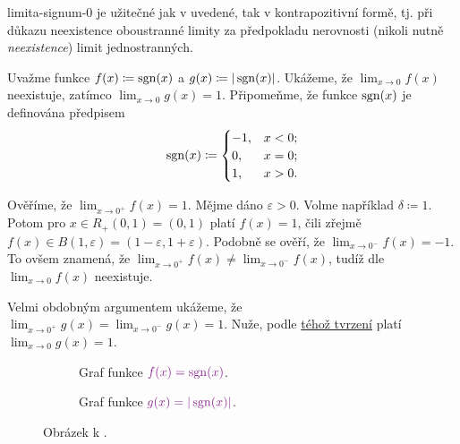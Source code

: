 \begin{example}{}{limita-signum-0}
  je užitečné
 jak v uvedené, tak v kontrapozitivní formě, tj. při důkazu neexistence
 oboustranné limity za předpokladu nerovnosti (nikoli nutně \emph{neexistence})
 limit jednostranných.

 Uvažme funkce $f(x) \coloneqq \operatorname{sgn}(x)$ a $g(x) \coloneqq |\operatorname{sgn}(x)|$. Ukážeme,
 že $\lim_{x \to 0} f(x)$ neexistuje, zatímco $\lim_{x \to 0} g(x) = 1$.
 Připomeňme, že funkce $\operatorname{sgn}(x)$ je definována předpisem
 \[
  \operatorname{sgn}(x) \coloneqq \begin{cases}
   -1, & x < 0;\\
   0, & x = 0;\\
   1, & x > 0.
  \end{cases}
 \]

 Ověříme, že $\lim_{x \to 0^{+}} f(x) = 1$. Mějme dáno $\varepsilon>0$. Volme
 například $\delta \coloneqq 1$. Potom pro $x \in R_+(0,1) = (0,1)$ platí $f(x)
 = 1$, čili zřejmě $f(x) \in B(1,\varepsilon) = (1-\varepsilon,1+\varepsilon)$.
 Podobně se ověří, že $\lim_{x \to 0^{-}} f(x) = -1$. To ovšem znamená, že
 $\lim_{x \to 0^{+}} f(x) \neq \lim_{x \to 0^{-}} f(x)$, tudíž dle
  $\lim_{x \to
 0} f(x)$ neexistuje.

 Velmi obdobným argumentem ukážeme, že $\lim_{x \to 0^{+}} g(x) = \lim_{x \to
 0^{-}} g(x) = 1$. Nuže, podle
 \hyperref[prop:vztah-jednostrannych-a-oboustrannych-limit]{téhož tvrzení} platí
 $\lim_{x \to 0} g(x) = 1$.
\end{example}

\begin{figure}[ht]
 \centering
 \begin{subfigure}[b]{0.49\textwidth}
  \centering
  \caption{Graf funkce $\clm{f(x) = \sign(x)}$.}
 \end{subfigure}
 \begin{subfigure}[b]{0.49\textwidth}
  \centering
  \caption{Graf funkce $\clm{g(x) = |\sign(x)|}$.}
 \end{subfigure}
 \caption{Obrázek k .}
 \label{fig:limita-signum-0}
\end{figure}

